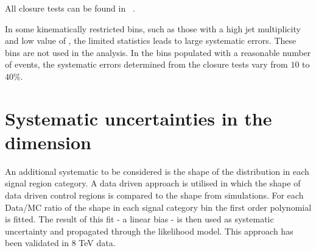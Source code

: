 All closure tests can be found in ~\cite{alphaTnote}.


In some kinematically restricted bins, such as those with a high jet multiplicity and low value of \scalht, the
limited statistics leads to large systematic errors. These bins are not used in the analysis. 
In the bins populated with a reasonable number of events, the systematic errors determined from the closure tests vary from $10$ to
$40\%$.


\section{Systematic uncertainties in the \mht dimension}

An additional systematic to be considered is the shape of the \mht distribution in each signal region category. 
A data driven approach is utilised in which the shape of data driven control regions is compared to the \mht shape from simulations.
For each Data/MC ratio of the shape in each signal category bin the first order polynomial is fitted. The result of this fit - a linear bias - 
is then used as systematic uncertainty and propagated through the likelihood model.
This approach has been validated in 8 TeV data. 




